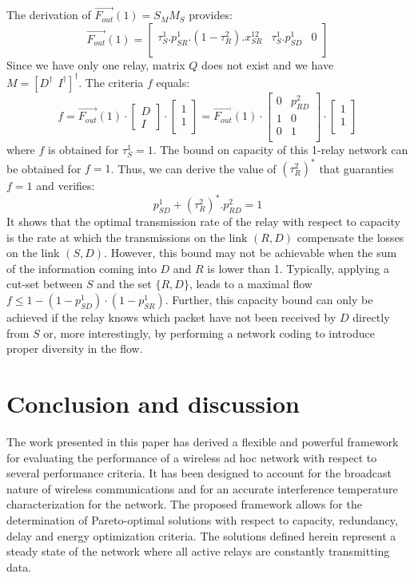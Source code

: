\documentclass[a4paper]{article}
\newcommand{\Fout}[3]{\overrightarrow{ F_{#1}^{#2}}(#3)}
\newcommand{\Mmatrix}{M}
\newcommand{\Qmatrix}{Q}
\newcommand{\Smatrix}{S_M}
\newcommand{\Msrc}{\Mmatrix_S}
\begin{document}
{The derivation of $\Fout{out}{}{1} = \Smatrix \Msrc$ provides:
\[
 \Fout{out}{}{1}  = \left[ 
\begin{array}{ccc}
	\tau_S^1.p_{SR}^1.(1-\tau_R^2).x_{SR}^{12} &
	\tau_S^1.p_{SD}^1 &
	0\\
\end{array}
\right]
\]
Since we have only one relay, matrix $\Qmatrix$ does not exist and we have $\Mmatrix = \left[ D^\dagger~~I^\dagger \right]^\dagger$. The criteria $f$ equals:
\[
f = \Fout{out}{}{1}\cdot \left[ \begin{array}{c} D\\ I \end{array} \right] 
\cdot \left[ 
	\begin{array}{c} 
		1  \\ 
		1	 \\ 
	\end{array}
\right]
= \Fout{out}{}{1} \cdot \left[ 
\begin{array}{ccc}
	0	& 	p_{RD}^2 \\
	1	&	0 \\
	0	&	1 \\
\end{array}
\right] \cdot \left[ 
	\begin{array}{c} 
		1  \\ 
		1	 \\ 
	\end{array}
\right]
\]
\noindent where $f$ is obtained for $\tau_S^1=1$. The bound on capacity of this 1-relay network can be obtained for $f=1$. 
Thus, we can derive the value of $(\tau_R^2)^*$ that guaranties $f=1$ and verifies: 
\[
p_{SD}^1+(\tau_R^2)^*.p_{RD}^2 =1
\]
\noindent It shows that the optimal transmission rate of the relay with respect to capacity is the rate at which the transmissions on the link $(R,D)$ compensate the losses on the link $(S,D)$. 
However, this bound may not be achievable when the sum of the information coming into $D$ and $R$ is lower than 1. 
Typically, applying a cut-set between $S$ and the set $\{R,D\}$, leads to a maximal flow $f \leq 1-(1-p_{SD}^1)\cdot(1-p_{SR}^1)$.
Further, this capacity bound can only be achieved if the relay knows which packet have not been received by $D$ directly from $S$ or, more interestingly, by performing a network coding to introduce proper diversity in the flow.    



\section{Conclusion and discussion}\label{sec:conclusion}
The work presented in this paper has derived a flexible and powerful framework for evaluating the performance of a wireless ad hoc network with respect to several performance criteria. It has been designed to account for the broadcast nature of wireless communications and for an accurate interference temperature characterization for the network. The proposed framework allows for the determination of Pareto-optimal solutions with respect to capacity, redundancy, delay and energy optimization criteria. 
The solutions defined herein represent a steady state of the network where all active relays are constantly transmitting data. 
  
}
\end{document}
